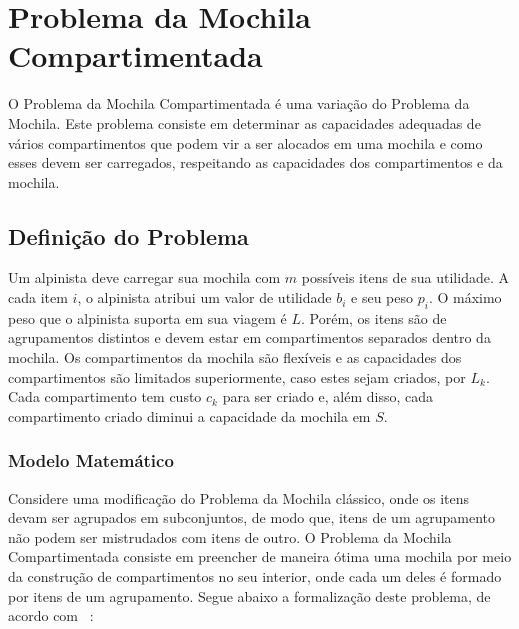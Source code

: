 \pagestyle{plain}

\chapter{Problema da Mochila Compartimentada} \label{sec:compartimentada}

O Problema da Mochila Compartimentada é uma variação do Problema da Mochila. Este problema consiste em determinar as capacidades adequadas de vários compartimentos que podem vir a ser alocados em uma mochila e como esses devem ser carregados, respeitando as capacidades dos compartimentos e da mochila.

\section{Definição do Problema}

Um alpinista deve carregar sua mochila com $m$ possíveis itens de sua utilidade. A cada item $i$, o alpinista atribui um valor de utilidade $b_i$ e seu peso $p_i$. O máximo peso que o alpinista suporta em sua viagem é $L$. Porém, os itens são de agrupamentos distintos e devem estar em compartimentos separados dentro da mochila. Os compartimentos da mochila são flexíveis e as capacidades dos compartimentos são limitados superiormente, caso estes sejam criados, por $L_k$. Cada compartimento tem custo $c_k$ para ser criado e, além disso, cada compartimento criado diminui a capacidade da mochila em $S$.

\subsection{Modelo Matemático}

Considere uma modificação do Problema da Mochila clássico, onde os itens devam ser agrupados em subconjuntos, de modo que, itens de um agrupamento não podem ser mistrudados com itens de outro. O Problema da Mochila Compartimentada consiste em preencher de maneira ótima uma mochila por meio da construção de compartimentos no seu interior, onde cada um deles é formado por itens de um agrupamento. Segue abaixo a formalização deste problema, de acordo com  ~\cite{Mar00}:

